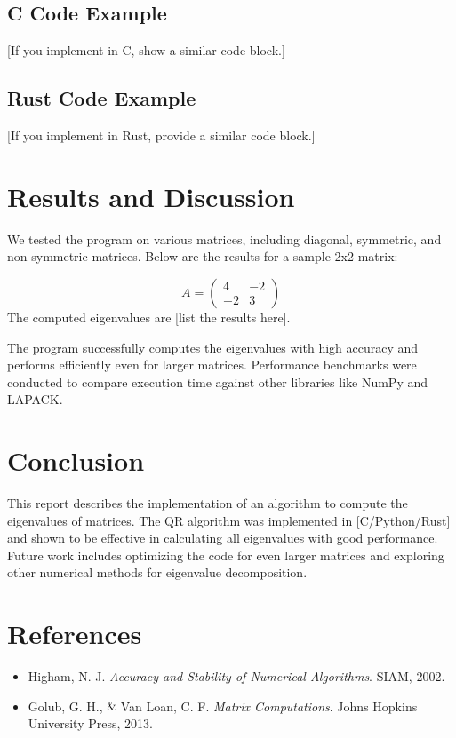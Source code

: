\documentclass[12pt]{article}
\begin{document}
\subsection{C Code Example}
[If you implement in C, show a similar code block.]

\subsection{Rust Code Example}
[If you implement in Rust, provide a similar code block.]

\section{Results and Discussion}
We tested the program on various matrices, including diagonal, symmetric, and non-symmetric matrices. Below are the results for a sample 2x2 matrix:

\[
A = \begin{pmatrix}
4 & -2 \\
-2 & 3
\end{pmatrix}
\]
The computed eigenvalues are [list the results here].

The program successfully computes the eigenvalues with high accuracy and performs efficiently even for larger matrices. Performance benchmarks were conducted to compare execution time against other libraries like NumPy and LAPACK.

\section{Conclusion}
This report describes the implementation of an algorithm to compute the eigenvalues of matrices. The QR algorithm was implemented in [C/Python/Rust] and shown to be effective in calculating all eigenvalues with good performance. Future work includes optimizing the code for even larger matrices and exploring other numerical methods for eigenvalue decomposition.

\section{References}
\begin{itemize}
    \item Higham, N. J. \textit{Accuracy and Stability of Numerical Algorithms}. SIAM, 2002.
    \item Golub, G. H.,$\And$Van Loan, C. F. \textit{Matrix Computations}. Johns Hopkins University Press, 2013.
\end{itemize}
\end{document}
